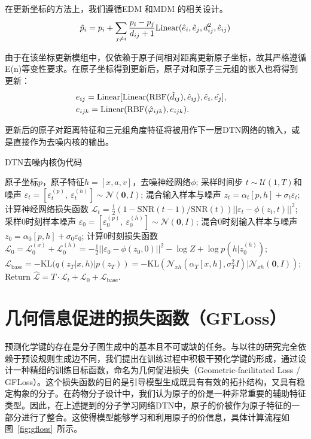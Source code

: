 在更新坐标的方法上，我们遵循EDM \cite{edm_hoogeboom_22}和MDM \cite{mdm_huang_23}的相关设计。
\begin{equation}
    \hat{p}_i = p_i + \sum_{j \neq i} \frac{p_i - p_j}{d_{ij} + 1} {\rm Linear}(\hat{e}_i, \hat{e}_j, d_{ij}^2, \hat{e}_{ij})
\end{equation}

由于在该坐标更新模组中，仅依赖于原子间相对距离更新原子坐标，故其严格遵循E(n)等变性要求。在原子坐标得到更新后，原子对和原子三元组的嵌入也将得到更新：
\begin{eqnarray}
  &e_{ij} = {\rm Linear}[{\rm Linear}({\rm RBF}(\hat{d}_{ij}), \hat{e}_{ij}), \hat{e}_i, \hat{e_j}],& \\
  &e_{ijk} = {\rm Linear}({\rm RBF}(\hat{\varphi}_{ijk}), e_{ijk}). &
\end{eqnarray}

更新后的原子对距离特征和三元组角度特征将被用作下一层DTN网络的输入，或是直接作为去噪内核的输出。

\begin{algorithm}[H]
    \caption{DTN去噪内核伪代码}
    \label{alg:dtn}
    \begin{algorithmic}
     原子坐标$p$，原子特征$h = [x, a, v]$，去噪神经网络$\phi$;
    \STATE 采样时间步 $t \sim \mathcal{U}(1, T)$和噪声 $\varepsilon_t = [\varepsilon^{(p)}_t, ~\varepsilon^{(h)}_t] \sim \mathcal{N}(\mathbf{0}, I)$;
    \STATE 混合输入样本与噪声 $z_t = \alpha_t [p, h] + \sigma_t \varepsilon_t$;
    \STATE 计算神经网络损失函数 $\mathcal{L}_t = \frac{1}{2}(1 - \mathrm{SNR}(t-1) / \mathrm{SNR}(t)) ||\varepsilon_t - \phi(z_t, t)||^2$;
    \STATE 采样0时刻样本噪声 $\varepsilon_0 = [\varepsilon^{(p)}_0, ~\varepsilon^{(h)}_0] \sim \mathcal{N}(\mathbf{0}, I)$;
    \STATE 混合0时刻输入样本与噪声 $z_0 = \alpha_0 [p, h] + \sigma_0 \varepsilon_0$;
    \STATE 计算0时刻损失函数 $\mathcal{L}_0 = \mathcal{L}_0^{(x)} + \mathcal{L}_0^{(h)} = -\frac{1}{2} ||\varepsilon_0 - \phi(z_0, 0)||^2 - \log Z + \log p(h | z_0^{(h)})$;
    \STATE $\mathcal{L}_{\text{base}} = -\mathrm{KL}(q(z_T | x, h) | p(z_T)) = -\mathrm{KL}(\mathcal{N}_{xh}(\alpha_T [x, h], \sigma_T^2 I) | \mathcal{N}_{xh}(\mathbf{0}, I))$;
    \STATE Return $\hat{\mathcal{L}} = T \cdot \mathcal{L}_t + \mathcal{L}_0 + \mathcal{L}_{\text{base}}$.
    \end{algorithmic}
\end{algorithm}

\section{几何信息促进的损失函数（GFLoss）}
预测化学键的存在是分子图生成中的基本且不可或缺的任务。与以往的研究完全依赖于预设规则生成边不同，我们提出在训练过程中积极干预化学键的形成，通过设计一种精细的训练目标函数，命名为几何促进损失（Geometric-facilitated Loss / GFLoss）。这个损失函数的目的是引导模型生成既具有有效的拓扑结构，又具有稳定构象的分子。在药物分子设计中，我们认为原子的价是一种非常重要的辅助特征类型。因此，在上述提到的分子学习网络DTN中，原子的价被作为原子特征的一部分进行了整合。这使得模型能够学习和利用原子的价信息，具体计算流程如图~\ref{fig:gfloss}~所示。

